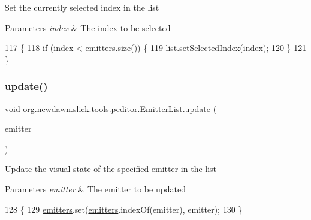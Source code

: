 Set the currently selected index in the list


\begin{DoxyParams}{Parameters}
{\em index} & The index to be selected \\
\hline
\end{DoxyParams}

\begin{DoxyCode}
117                                        \{
118         \textcolor{keywordflow}{if} (index < \mbox{\hyperlink{classorg_1_1newdawn_1_1slick_1_1tools_1_1peditor_1_1_emitter_list_af49e1d51ea3ee483a77a30ce7aaa6d89}{emitters}}.size()) \{
119             \mbox{\hyperlink{classorg_1_1newdawn_1_1slick_1_1tools_1_1peditor_1_1_emitter_list_a201acbbfa375f50045f4f87452a9c722}{list}}.setSelectedIndex(index);
120         \}
121     \}
\end{DoxyCode}
\mbox{\label{classorg_1_1newdawn_1_1slick_1_1tools_1_1peditor_1_1_emitter_list_a7adaa05d68e52574bcb10b551bbc081d}} 
\subsubsection{\texorpdfstring{update()}{update()}}
{\footnotesize\ttfamily void org.\+newdawn.\+slick.\+tools.\+peditor.\+Emitter\+List.\+update (\begin{DoxyParamCaption}\item[{\mbox{\hyperlink{classorg_1_1newdawn_1_1slick_1_1particles_1_1_configurable_emitter}{Configurable\+Emitter}}}]{emitter }\end{DoxyParamCaption})\hspace{0.3cm}{\ttfamily [inline]}}

Update the visual state of the specified emitter in the list


\begin{DoxyParams}{Parameters}
{\em emitter} & The emitter to be updated \\
\hline
\end{DoxyParams}

\begin{DoxyCode}
128                                                     \{
129         \mbox{\hyperlink{classorg_1_1newdawn_1_1slick_1_1tools_1_1peditor_1_1_emitter_list_af49e1d51ea3ee483a77a30ce7aaa6d89}{emitters}}.set(\mbox{\hyperlink{classorg_1_1newdawn_1_1slick_1_1tools_1_1peditor_1_1_emitter_list_af49e1d51ea3ee483a77a30ce7aaa6d89}{emitters}}.indexOf(emitter), emitter);
130     \}
\end{DoxyCode}


